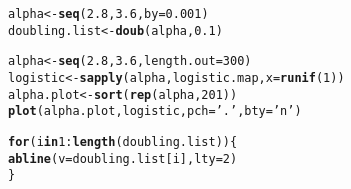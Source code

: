 \documentclass[12pt]{article}\usepackage[]{graphicx}\usepackage[]{color}
\makeatletter
\newcommand{\hlnum}[1]{\textcolor[rgb]{0.686,0.059,0.569}{#1}}%
\newcommand{\hlstr}[1]{\textcolor[rgb]{0.192,0.494,0.8}{#1}}%
\newcommand{\hlopt}[1]{\textcolor[rgb]{0,0,0}{#1}}%
\newcommand{\hlstd}[1]{\textcolor[rgb]{0.345,0.345,0.345}{#1}}%
\newcommand{\hlkwa}[1]{\textcolor[rgb]{0.161,0.373,0.58}{\textbf{#1}}}%
\newcommand{\hlkwb}[1]{\textcolor[rgb]{0.69,0.353,0.396}{#1}}%
\newcommand{\hlkwc}[1]{\textcolor[rgb]{0.333,0.667,0.333}{#1}}%
\newcommand{\hlkwd}[1]{\textcolor[rgb]{0.737,0.353,0.396}{\textbf{#1}}}%
\newenvironment{kframe}{%
 \def\at@end@of@kframe{}%
 \ifinner\ifhmode%
  \def\at@end@of@kframe{\end{minipage}}%
  \begin{minipage}{\columnwidth}%
 \fi\fi%
 \def\FrameCommand##1{\hskip\@totalleftmargin \hskip-\fboxsep
 \colorbox{shadecolor}{##1}\hskip-\fboxsep
     \hskip-\linewidth \hskip-\@totalleftmargin \hskip\columnwidth}%
 \MakeFramed {\advance\hsize-\width
   \@totalleftmargin\z@ \linewidth\hsize
   \@setminipage}}%
 {\par\unskip\endMakeFramed%
 \at@end@of@kframe}
\newenvironment{knitrout}{}{} %
\makeatother
\begin{document}
\begin{knitrout}
\begin{kframe}
\begin{alltt}
\hlstd{alpha} \hlkwb{<-} \hlkwd{seq}\hlstd{(}\hlnum{2.8}\hlstd{,} \hlnum{3.6}\hlstd{,} \hlkwc{by} \hlstd{=} \hlnum{0.001}\hlstd{)}
\hlstd{doubling.list} \hlkwb{<-} \hlkwd{doub}\hlstd{(alpha,} \hlnum{0.1}\hlstd{)}

\hlstd{alpha} \hlkwb{<-} \hlkwd{seq}\hlstd{(}\hlnum{2.8}\hlstd{,} \hlnum{3.6}\hlstd{,} \hlkwc{length.out} \hlstd{=} \hlnum{300}\hlstd{)}
\hlstd{logistic} \hlkwb{<-} \hlkwd{sapply}\hlstd{(alpha, logistic.map,} \hlkwc{x} \hlstd{=} \hlkwd{runif}\hlstd{(}\hlnum{1}\hlstd{))}
\hlstd{alpha.plot} \hlkwb{<-} \hlkwd{sort}\hlstd{(}\hlkwd{rep}\hlstd{(alpha,} \hlnum{201}\hlstd{))}
\hlkwd{plot}\hlstd{(alpha.plot, logistic,} \hlkwc{pch} \hlstd{=} \hlstr{'.'}\hlstd{,} \hlkwc{bty} \hlstd{=} \hlstr{'n'}\hlstd{)}

\hlkwa{for} \hlstd{(i} \hlkwa{in} \hlnum{1}\hlopt{:}\hlkwd{length}\hlstd{(doubling.list))\{}
  \hlkwd{abline}\hlstd{(}\hlkwc{v} \hlstd{= doubling.list[i],} \hlkwc{lty} \hlstd{=} \hlnum{2}\hlstd{)}
\hlstd{\}}
\end{alltt}
\end{kframe}
\end{knitrout}
\end{document}
